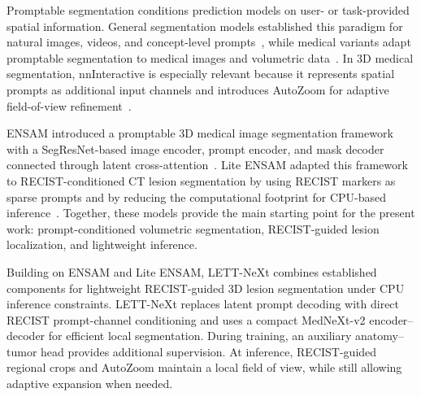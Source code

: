 Promptable segmentation conditions prediction models on user- or task-provided spatial information. General segmentation models established this paradigm for natural images, videos, and concept-level prompts~\cite{kirillovSegmentAnything2023,raviSAM2Segment2024,carionSAM3Segment2026}, while medical variants adapt promptable segmentation to medical images and volumetric data~\cite{maSegmentAnythingMedical2024,wangSAMMed3DGeneralpurposeSegmentation2024,duSegVolUniversalInteractive2025}. In 3D medical segmentation, nnInteractive is especially relevant because it represents spatial prompts as additional input channels and introduces AutoZoom for adaptive field-of-view refinement~\cite{isenseeNnInteractiveRedefining3D2025}.

ENSAM introduced a promptable 3D medical image segmentation framework with a SegResNet-based image encoder, prompt encoder, and mask decoder connected through latent cross-attention~\cite{stenhedeENSAMEfficientFoundation2025}. Lite ENSAM adapted this framework to RECIST-conditioned CT lesion segmentation by using RECIST markers as sparse prompts and by reducing the computational footprint for CPU-based inference~\cite{bjornstadLiteENSAMLightweight2025}. Together, these models provide the main starting point for the present work: prompt-conditioned volumetric segmentation, RECIST-guided lesion localization, and lightweight inference. 

Building on ENSAM and Lite ENSAM, LETT-NeXt combines established components for lightweight RECIST-guided 3D lesion segmentation under CPU inference constraints. LETT-NeXt replaces latent prompt decoding with direct RECIST prompt-channel conditioning and uses a compact MedNeXt-v2 encoder–decoder for efficient local segmentation. During training, an auxiliary anatomy–tumor head provides additional supervision. At inference, RECIST-guided regional crops and AutoZoom maintain a local field of view, while still allowing adaptive expansion when needed.



